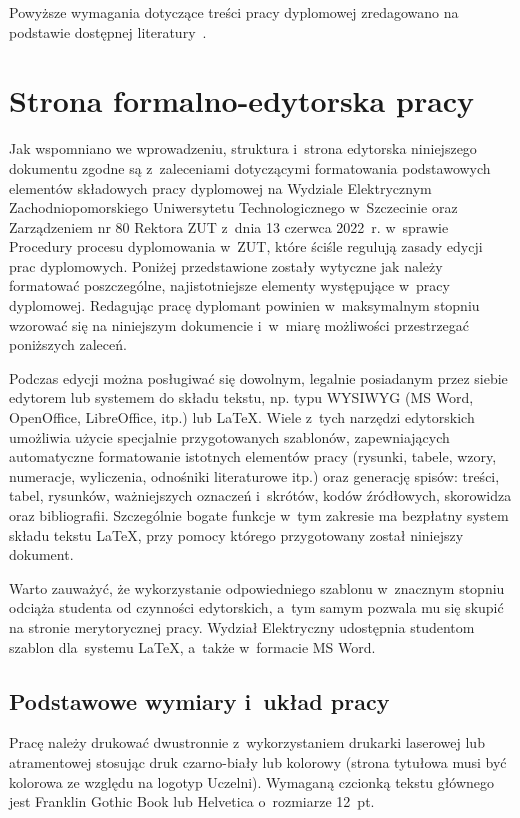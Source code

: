 \documentclass[skorowidz,skroty]{dyplomWEZUT}
\begin{document}
\noindent Powyższe wymagania dotyczące treści pracy dyplomowej zredagowano na podstawie dostępnej literatury~\cite{Boc2003,Honczarenko2000,Opoka2001,Pioterek1997,Zenderowski2004}.

\chapter{Strona formalno-edytorska pracy}\label{chap:editing}

Jak wspomniano we wprowadzeniu, struktura i~strona edytorska niniejszego dokumentu zgodne są z~zaleceniami dotyczącymi formatowania podstawowych elementów składowych pracy dyplomowej na Wydziale Elektrycznym Zachodniopomorskiego Uniwersytetu Technologicznego w~Szczecinie oraz Zarządzeniem nr 80 Rektora ZUT z~dnia 13 czerwca 2022~r. w~sprawie Procedury procesu dyplomowania w~ZUT, które ściśle regulują zasady edycji prac dyplomowych. Poniżej przedstawione zostały wytyczne jak należy formatować poszczególne, najistotniejsze elementy występujące w~pracy dyplomowej. Redagując pracę dyplomant powinien w~maksymalnym stopniu wzorować się na niniejszym dokumencie i~w~miarę możliwości przestrzegać poniższych zaleceń.

Podczas edycji można posługiwać się dowolnym, legalnie posiadanym przez siebie edytorem lub systemem do składu tekstu, np. typu WYSIWYG (MS Word, OpenOffice, LibreOffice, itp.) lub LaTeX. Wiele z~tych narzędzi edytorskich umożliwia użycie specjalnie przygotowanych szablonów, zapewniających automatyczne formatowanie istotnych elementów pracy (rysunki, tabele, wzory, numeracje, wyliczenia, odnośniki literaturowe itp.) oraz generację spisów: treści, tabel, rysunków, ważniejszych oznaczeń i~skrótów, kodów źródłowych, skorowidza oraz bibliografii. Szczególnie bogate funkcje w~tym zakresie ma bezpłatny system składu tekstu LaTeX, przy pomocy którego przygotowany został niniejszy dokument.

Warto zauważyć, że wykorzystanie odpowiedniego szablonu w~znacznym stopniu odciąża studenta od czynności edytorskich, a~tym samym pozwala mu się skupić na stronie merytorycznej pracy. Wydział Elektryczny udostępnia studentom szablon dla~systemu LaTeX, a~także w~formacie MS Word.

\section{Podstawowe wymiary i~układ pracy}\label{sec:wymiary}

Pracę należy drukować dwustronnie z~wykorzystaniem drukarki laserowej lub atramentowej stosując druk czarno-biały lub kolorowy (strona tytułowa musi być kolorowa ze względu na logotyp Uczelni). Wymaganą czcionką tekstu głównego jest Franklin Gothic Book lub Helvetica o~rozmiarze 12~pt. 
\end{document}
